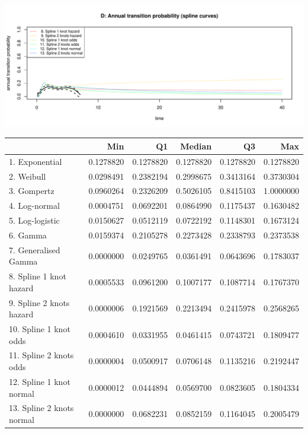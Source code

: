 \documentclass[]{article}
\begin{document}
\begin{flushleft}\includegraphics[height=0.29\textheight]{images/validate_extrapolation2-4} \end{flushleft}

\begin{tabular}{lrrrrr}
\toprule
  & Min & Q1 & Median & Q3 & Max\\
\midrule
\rowcolor{gray!6}  1. Exponential & 0.1278820 & 0.1278820 & 0.1278820 & 0.1278820 & 0.1278820\\
2. Weibull & 0.0298491 & 0.2382194 & 0.2998675 & 0.3413164 & 0.3730304\\
\rowcolor{gray!6}  3. Gompertz & 0.0960264 & 0.2326209 & 0.5026105 & 0.8415103 & 1.0000000\\
4. Log-normal & 0.0004751 & 0.0692201 & 0.0864990 & 0.1175437 & 0.1630482\\
\rowcolor{gray!6}  5. Log-logistic & 0.0150627 & 0.0512119 & 0.0722192 & 0.1148301 & 0.1673124\\
6. Gamma & 0.0159374 & 0.2105278 & 0.2273428 & 0.2338793 & 0.2373538\\
\rowcolor{gray!6}  7. Generalised Gamma & 0.0000000 & 0.0249765 & 0.0361491 & 0.0643696 & 0.1783037\\
8. Spline 1 knot hazard & 0.0005533 & 0.0961200 & 0.1007177 & 0.1087714 & 0.1767370\\
\rowcolor{gray!6}  9. Spline 2 knots hazard & 0.0000006 & 0.1921569 & 0.2213494 & 0.2415978 & 0.2568265\\
10. Spline 1 knot odds & 0.0004610 & 0.0331955 & 0.0461415 & 0.0743721 & 0.1809477\\
\rowcolor{gray!6}  11. Spline 2 knots odds & 0.0000004 & 0.0500917 & 0.0706148 & 0.1135216 & 0.2192447\\
12. Spline 1 knot normal & 0.0000012 & 0.0444894 & 0.0569700 & 0.0823605 & 0.1804334\\
\rowcolor{gray!6}  13. Spline 2 knots normal & 0.0000000 & 0.0682231 & 0.0852159 & 0.1164045 & 0.2005479\\
\bottomrule
\end{tabular}
\end{document}
